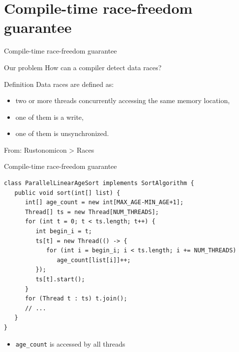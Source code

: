 \documentclass[handout]{beamer} %
\begin{document}

\section{Compile-time race-freedom\\ guarantee}


\begin{frame}{Compile-time race-freedom guarantee}
	\begin{block}{Our problem}
	How can a compiler detect data races?
	\end{block}
	\pause
	\begin{block}{Definition}
	Data races are defined as:
	\begin{itemize}
		\item two or more threads concurrently accessing 
		{\color{blue} the same memory location},
		\item one of them {\color{blue} is a write},
		\item one of them {\color{blue} is unsynchronized}.
	\end{itemize}
	\raggedleft From: Rustonomicon > Races
	\end{block}
\end{frame}

\begin{frame}[fragile]{Compile-time race-freedom guarantee}
	\begin{lstlisting}
class ParallelLinearAgeSort implements SortAlgorithm {
   public void sort(int[] list) {
      int[] age_count = new int[MAX_AGE-MIN_AGE+1];
      Thread[] ts = new Thread[NUM_THREADS];
      for (int t = 0; t < ts.length; t++) {
         int begin_i = t;
         ts[t] = new Thread(() -> {
            for (int i = begin_i; i < ts.length; i += NUM_THREADS)
               age_count[list[i]]++;
         });
         ts[t].start();
      }
      for (Thread t : ts) t.join();
      // ...
   }
}
	\end{lstlisting}
	\begin{itemize}
	\item \texttt{age\_count} is accessed by all threads
	\end{itemize}
\end{frame}

\end{document}
